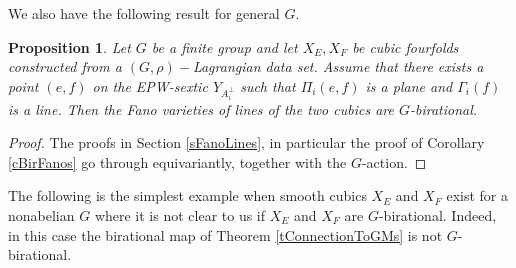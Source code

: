 \documentclass[11pt]{amsart}
\theoremstyle{plain}
\newtheorem{proposition}[theorem]{Proposition}
\numberwithin{equation}{section}
\theoremstyle{definition}
\theoremstyle{remark}
\begin{document}
We also have the following result for general $G$. 

\begin{proposition}\label{prop:FanoLinesBirational}
Let $G$ be a finite group and let $X_E, X_F$ be cubic fourfolds constructed from a $(G, \rho)-$Lagrangian data set. Assume that there exists a point  $(e,f)$ on the EPW-sextic $Y_{A_i^\perp}$ such that $\Pi_i(e,f)$ is a plane and    $\Gamma_i(f)$ is a line. Then the Fano varieties of lines of the two cubics are $G$-birational. 
\end{proposition}

\begin{proof}
The proofs in Section \ref{sFanoLines}, in particular the proof of Corollary \ref{cBirFanos} go through equivariantly, together with the $G$-action. 
\end{proof}

The following is the simplest example when smooth cubics $X_E$ and $X_F$ exist for a nonabelian $G$ where it is not clear to us if $X_E$ and $X_F$ are $G$-birational. Indeed, in this case the birational map of Theorem \ref{tConnectionToGMs} is not $G$-birational.
\end{document}
